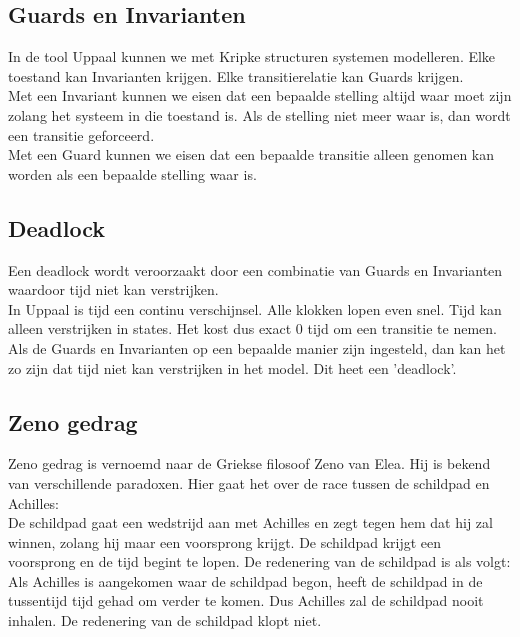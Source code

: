 \documentclass{article}
\begin{document}
		\subsection{Guards en Invarianten}
		
		In de tool Uppaal kunnen we met Kripke structuren systemen modelleren. Elke toestand kan Invarianten krijgen. Elke transitierelatie kan Guards krijgen. \\		
		Met een Invariant kunnen we eisen dat een bepaalde stelling altijd waar moet zijn zolang het systeem in die toestand is. Als de stelling niet meer waar is, dan wordt een transitie geforceerd. \\
		Met een Guard kunnen we eisen dat een bepaalde transitie alleen genomen kan worden als een bepaalde stelling waar is.
		
		\subsection{Deadlock}
		
		Een deadlock wordt veroorzaakt door een combinatie van Guards en Invarianten waardoor tijd niet kan verstrijken. \\
		In Uppaal is tijd een continu verschijnsel. Alle klokken lopen even snel. Tijd kan alleen verstrijken in states. Het kost dus exact 0 tijd om een transitie te nemen. Als de Guards en Invarianten op een bepaalde manier zijn ingesteld, dan kan het zo zijn dat tijd niet kan verstrijken in het model. Dit heet een 'deadlock'.
		
		\subsection{Zeno gedrag}
		
		Zeno gedrag is vernoemd naar de Griekse filosoof Zeno van Elea. Hij is bekend van verschillende paradoxen. Hier gaat het over de race tussen de schildpad en Achilles: \\		
		De schildpad gaat een wedstrijd aan met Achilles en zegt tegen hem dat hij zal winnen, zolang hij maar een voorsprong krijgt. De schildpad krijgt een voorsprong en de tijd begint te lopen. De redenering van de schildpad is als volgt: Als Achilles is aangekomen waar de schildpad begon, heeft de schildpad in de tussentijd tijd gehad om verder te komen. Dus Achilles zal de schildpad nooit inhalen. De redenering van de schildpad klopt niet. \par
\end{document}
